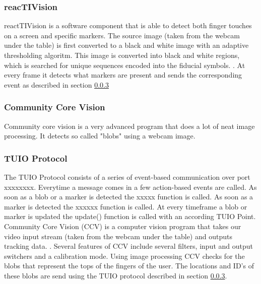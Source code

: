 \documentclass[a4paper,10pt]{article}
\begin{document}
		\subsubsection{reacTIVision}
		\label{sec:reactivision}
		reactTIVision is a software component that is able to detect both finger touches on a screen and specific markers. 
		The source image (taken from the webcam under the table) is first converted to a black and white image with an adaptive thresholding algoritm. 
		This image is converted into black and white regions, which is searched for unique sequences encoded into the fiducial symbols. \cite{reactivision}.
		At every frame it detects what markers are present and sends the corresponding event as described in section \ref{sec:tuioprotocol}
		
		\subsubsection{Community Core Vision}
		\label{sec:communitycorevision}	
		Community core vision is a very advanced program that does a lot of neat image processing. 
		It detects so called "blobs" using a webcam image. 

		\subsubsection{TUIO Protocol}
		\label{sec:tuioprotocol}
		The TUIO Protocol consists of a series of event-based communication over port xxxxxxxx. 
		Everytime a message comes in a few action-based events are called.  
		As soon as a blob or a marker is detected the xxxxx function is called. 
		As soon as a marker is detected the xxxxxx function is called. 
		At every timeframe a blob or marker is updated the update() function is called with an according TUIO Point.
		Community Core Vision (CCV) is a computer vision program that takes our video input stream (taken from the webcam under the table) and outputs tracking data. \cite{ccv}.
		Several features of CCV include several filters, input and output switchers and a calibration mode. 
		Using image processing CCV checks for the blobs that represent the tops of the fingers of the user. 
		The locations and ID's of these blobs are send using the TUIO protocol described in section \ref{sec:tuioprotocol}.
		
		
\end{document}
